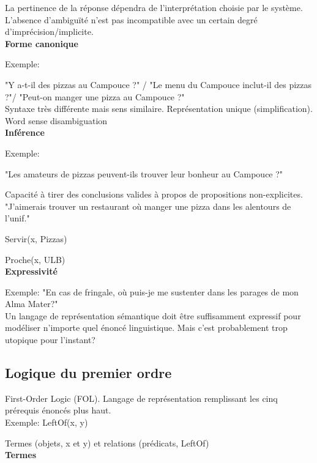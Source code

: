 La pertinence de la réponse dépendra de l'interprétation choisie par le système. L'absence d'ambiguïté n'est pas incompatible avec un certain degré d'imprécision/implicite.\\

\textbf{Forme canonique}

Exemple:

"Y a-t-il des pizzas au Campouce ?" / "Le menu du Campouce inclut-il des pizzas ?"/ "Peut-on manger une pizza au Campouce ?"\\

Syntaxe très différente mais sens similaire. Représentation unique (simplification). Word sense disambiguation\\

\textbf{Inférence}

Exemple:

"Les amateurs de pizzas peuvent-ils trouver leur bonheur au Campouce ?"

Capacité à tirer des conclusions valides à propos de propositions non-explicites. \\

"J'aimerais trouver un restaurant où manger une pizza dans les alentours de l'unif."

Servir(x, Pizzas)

Proche(x, ULB)\\

\textbf{Expressivité}

Exemple: "En cas de fringale, où puis-je me sustenter dans les parages de mon Alma Mater?"\\

Un langage de représentation sémantique doit être suffisamment expressif pour modéliser n'importe quel énoncé linguistique. Mais c'est probablement trop utopique pour l'instant?\\

\subsection{Logique du premier ordre}

First-Order Logic (FOL). Langage de représentation remplissant les cinq prérequis énoncés plus haut.\\

Exemple: LeftOf(x, y)

Termes (objets, x et y) et relations (prédicats, LeftOf)\\

\textbf{Termes}

